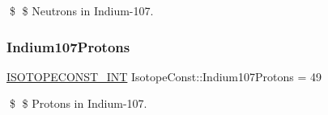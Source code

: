 \$ \$ Neutrons in Indium-\/107. \mbox{\label{group___isotope_const-_indium-_in107_gae3c13445b817ea3cc24db5f94591039e}} 
\subsubsection{\texorpdfstring{Indium107\+Protons}{Indium107Protons}}
{\footnotesize\ttfamily \mbox{\hyperlink{group___isotope_const-_macros_ga5f18360b3e99483a35c32d789e62621c}{I\+S\+O\+T\+O\+P\+E\+C\+O\+N\+S\+T\+\_\+\+I\+NT}} Isotope\+Const\+::\+Indium107\+Protons = 49}

\$ \$ Protons in Indium-\/107. 